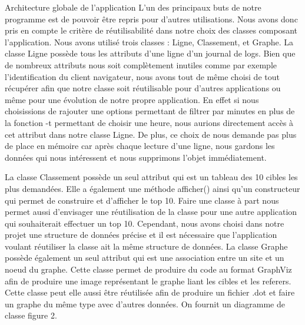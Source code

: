 \documentclass[11pt]{article}
\begin{document}
\begin{section}{Architecture globale de l'application}
L'un des principaux buts de notre programme est de pouvoir être repris pour d'autres utilisations. Nous avons donc pris en compte le critère de réutilisabilité dans notre choix des classes composant l'application.
Nous avons utilisé trois classes : Ligne, Classement, et Graphe. 
La classe Ligne possède tous les attributs d'une ligne d'un journal de logs. Bien que de nombreux attributs nous soit complètement inutiles comme par exemple l'identification du client navigateur, nous avons tout de même choisi de tout récupérer afin que notre classe soit réutilisable pour d'autres applications ou même pour une évolution de notre propre application. En effet si nous choisissions de rajouter une options permettant de filtrer par minutes en plus de la fonction -t permettant de choisir une heure, nous aurions directement accès à cet attribut dans notre classe Ligne. De plus, ce choix de nous demande pas plus de place en mémoire car après chaque lecture d'une ligne, nous gardons les données qui nous intéressent et nous supprimons l'objet immédiatement.

La classe Classement possède un seul attribut qui est un tableau des 10 cibles les plus demandées. Elle a également une méthode afficher() ainsi qu'un constructeur qui permet de construire et d'afficher le top 10. Faire une classe à part nous permet aussi d'envisager une réutilisation de la classe pour une autre application qui souhaiterait effectuer un top 10. Cependant, nous avons choisi dans notre projet une structure de données précise et il est nécessaire que l'application voulant réutiliser la classe ait la même structure de données.
La classe Graphe possède également un seul attribut qui est une association entre un site et un noeud du graphe. Cette classe permet de produire du code au format GraphViz afin de produire une image représentant le graphe liant les cibles et les referers. Cette classe peut elle aussi être réutilisée afin de produire un fichier .dot et faire un graphe du même type avec d'autres données.
On fournit un diagramme de classe figure 2.


\end{section}
\end{document}
